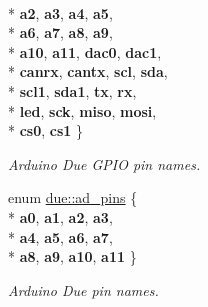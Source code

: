 \begin{DoxyCompactItemize}
\\*
{\bfseries a2}, 
{\bfseries a3}, 
{\bfseries a4}, 
{\bfseries a5}, 
\\*
{\bfseries a6}, 
{\bfseries a7}, 
{\bfseries a8}, 
{\bfseries a9}, 
\\*
{\bfseries a10}, 
{\bfseries a11}, 
{\bfseries dac0}, 
{\bfseries dac1}, 
\\*
{\bfseries canrx}, 
{\bfseries cantx}, 
{\bfseries scl}, 
{\bfseries sda}, 
\\*
{\bfseries scl1}, 
{\bfseries sda1}, 
{\bfseries tx}, 
{\bfseries rx}, 
\\*
{\bfseries led}, 
{\bfseries sck}, 
{\bfseries miso}, 
{\bfseries mosi}, 
\\*
{\bfseries cs0}, 
{\bfseries cs1}
 \}\begin{DoxyCompactList}\small\item\em Arduino Due G\+P\+IO pin names. \end{DoxyCompactList}
\item 
enum \hyperlink{namespacedue_a5ecc98d40585c91eabbfb14f71bd7d4c}{due\+::ad\+\_\+pins} \{ \\*
{\bfseries a0}, 
{\bfseries a1}, 
{\bfseries a2}, 
{\bfseries a3}, 
\\*
{\bfseries a4}, 
{\bfseries a5}, 
{\bfseries a6}, 
{\bfseries a7}, 
\\*
{\bfseries a8}, 
{\bfseries a9}, 
{\bfseries a10}, 
{\bfseries a11}
 \}\begin{DoxyCompactList}\small\item\em Arduino Due pin names. \end{DoxyCompactList}
\end{DoxyCompactItemize}
